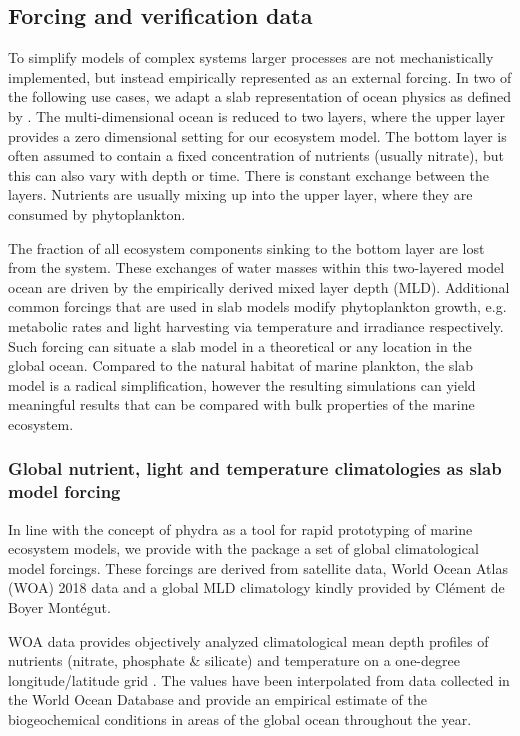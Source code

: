 \documentclass[journal abbreviation, manuscript]{copernicus}
\begin{document}

\subsection{Forcing and verification data}

To simplify models of complex systems larger processes are not mechanistically implemented, but instead empirically represented as an external forcing. In two of the following use cases, we adapt a slab representation of ocean physics as defined by \citet{Evans1985ACycles}. The multi-dimensional ocean is reduced to two layers, where the upper layer provides a zero dimensional setting for our ecosystem model. The bottom layer is often assumed to contain a fixed concentration of nutrients (usually nitrate), but this can also vary with depth or time. There is constant exchange between the layers. Nutrients are usually mixing up into the upper layer, where they are consumed by phytoplankton. 

The fraction of all ecosystem components sinking to the bottom layer are lost from the system. These exchanges of water masses within this two-layered model ocean are driven by the empirically derived mixed layer depth (MLD). Additional common forcings that are used in slab models modify phytoplankton growth, e.g. metabolic rates and light harvesting via temperature and irradiance respectively. Such forcing can situate a slab model in a theoretical or any location in the global ocean. Compared to the natural habitat of marine plankton, the slab model is a radical simplification, however the resulting simulations can yield meaningful results that can be compared with bulk properties of the marine ecosystem. 

\subsubsection{Global nutrient, light and temperature climatologies as slab model forcing}
In line with the concept of phydra as a tool for rapid prototyping of marine ecosystem models, we provide with the package a set of global climatological model forcings. These forcings are derived from satellite data, World Ocean Atlas (WOA) 2018 data and a global MLD climatology kindly provided by Clément de Boyer Montégut.

WOA data provides objectively analyzed climatological mean depth profiles of nutrients (nitrate, phosphate \& silicate) and temperature on a one-degree longitude/latitude grid \cite{Garcia2019WORLDSilicate}. The values have been interpolated from data collected in the World Ocean Database and provide an empirical estimate of the biogeochemical conditions in areas of the global ocean throughout the year.\\
\end{document}
